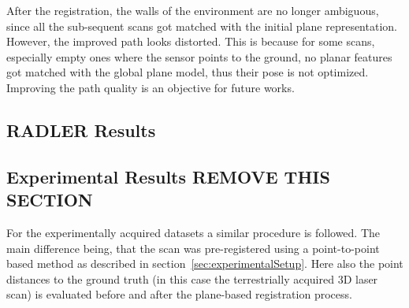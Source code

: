 After the registration, the walls of the environment are no longer ambiguous, since all the sub-sequent scans got matched with the initial plane representation.
However, the improved path looks distorted.
This is because for some scans, especially empty ones where the sensor points to the ground, no planar features got matched with the global plane model, thus their pose is not optimized.
Improving the path quality is an objective for future works.

\iffalse
\subsection{RADLER Results}

\subsection{Experimental Results REMOVE THIS SECTION}

For the experimentally acquired datasets a similar procedure is followed. 
The main difference being, that the scan was pre-registered using a point-to-point based method as described in section~\ref{sec:experimentalSetup}. 
Here also the point distances to the ground truth (in this case the terrestrially acquired 3D laser scan) is evaluated before and after the plane-based registration process. 

